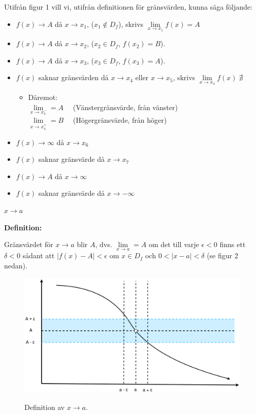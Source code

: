 \documentclass[swedish]{article}
\begin{document}
Utifrån figur 1 vill vi, utifrån definitionen för gränsvärden, kunna säga följande:

\begin{itemize}
    \item{$f(x) \to A$ då $x \to x_1$, ($x_1 \notin D_f$), skrivs $\lim\limits_{x \to x_1} f(x) = A$}
    \item{$f(x) \to A$ då $x \to x_2$, ($x_2 \in D_f$, $f(x_2) = B$).}
    \item{$f(x) \to A$ då $x \to x_3$, ($x_3 \in D_f$, $f(x_3) = A$).}
    \item{$f(x)$ saknar gränsvärden då $x \to x_4$ eller $x \to x_5$, skrivs $\lim\limits_{x \to x_4} f(x) \; \nexists$}
        \begin{itemize}
            \item{Däremot:\\

                $\lim\limits_{x \to x_4^-} = A \quad$ (Vänstergränsvärde, från vänster)\\

                $\lim\limits_{x \to x_4^+} = B \quad$ (Högergränsvärde, från höger)}
        \end{itemize}
    \smallbreak
    \item{$f(x) \to \infty$ då $x \to x_6$}
    \item{$f(x)$ saknar gränsvärde då $x \to x_7$}
    \item{$f(x) \to A$ då $x \to \infty$}
    \item{$f(x)$ saknar gränsvärde då $x \to -\infty$}
\end{itemize}

\bigbreak

{\large\underline{$x \to a$}}

\smallbreak

\textbf{Definition:}

\smallskip

Gränsvärdet för $x \to a$ blir $A$, dvs. $\lim\limits_{x \to a} = A$ om det till varje $\epsilon < 0$ finns ett $\delta < 0$ sådant att $|f(x) - A| < \epsilon$ om $x \in D_f$ och $0 < |x - a| < \delta$ (se figur 2 nedan). 

\begin{figure}[h!]
    \includegraphics[width=14cm]{figur2.png}
    \label{fig:figur2}
    \caption{Definition av $x \to a$.}
\end{figure}
\end{document}
